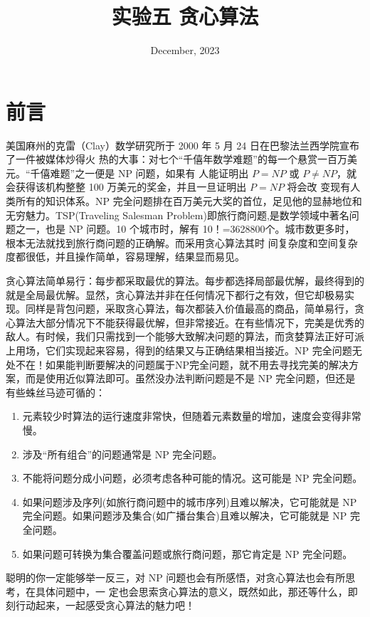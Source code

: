\documentclass[12pt,a4paper]{article}
\title{实验五 \hspace{0.5cm} 贪心算法}
\author{}
\date{December, 2023}
\begin{document}
\maketitle

\section{前言}
美国麻州的克雷（Clay）数学研究所于 2000 年 5 月 24 日在巴黎法兰西学院宣布了一件被媒体炒得火 热的大事：对七个“千僖年数学难题”的每一个悬赏一百万美元。“千僖难题”之一便是 NP 问题，如果有 人能证明出 $P = \textit{NP}$ 或 $P \neq \textit{NP}$，就会获得该机构整整 100 万美元的奖金，并且一旦证明出 $P = \textit{NP}$ 将会改 变现有人类所有的知识体系。NP 完全问题排在百万美元大奖的首位，足见他的显赫地位和无穷魅力。TSP(Traveling Salesman Problem)即旅行商问题,是数学领域中著名问题之一，也是 NP 问题。10 个城市时，解有 10！=3628800个。城市数更多时，根本无法就找到旅行商问题的正确解。而采用贪心算法其时 间复杂度和空间复杂度都很低，并且操作简单，容易理解，结果显而易见。

贪心算法简单易行：每步都采取最优的算法。每步都选择局部最优解，最终得到的就是全局最优解。显然，贪心算法并非在任何情况下都行之有效，但它却极易实现。同样是背包问题，采取贪心算法，每次都装入价值最高的商品，简单易行，贪心算法大部分情况下不能获得最优解，但非常接近。在有些情况下，完美是优秀的敌人。有时候，我们只需找到一个能够大致解决问题的算法，而贪婪算法正好可派上用场，它们实现起来容易，得到的结果又与正确结果相当接近。NP 完全问题无处不在！如果能判断要解决的问题属于NP完全问题，就不用去寻找完美的解决方案，而是使用近似算法即可。虽然没办法判断问题是不是 NP 完全问题，但还是有些蛛丝马迹可循的：
\begin{enumerate}
    \item 元素较少时算法的运行速度非常快，但随着元素数量的增加，速度会变得非常慢。
    \item 涉及“所有组合”的问题通常是 NP 完全问题。
    \item 不能将问题分成小问题，必须考虑各种可能的情况。这可能是 NP 完全问题。
    \item 如果问题涉及序列(如旅行商问题中的城市序列)且难以解决，它可能就是 NP 完全问题。如果问题涉及集合(如广播台集合)且难以解决，它可能就是 NP 完全问题。
    \item 如果问题可转换为集合覆盖问题或旅行商问题，那它肯定是 NP 完全问题。
\end{enumerate}

聪明的你一定能够举一反三，对 NP 问题也会有所感悟，对贪心算法也会有所思考，在具体问题中，一 定也会思索贪心算法的意义，既然如此，那还等什么，即刻行动起来，一起感受贪心算法的魅力吧！
\end{document}
